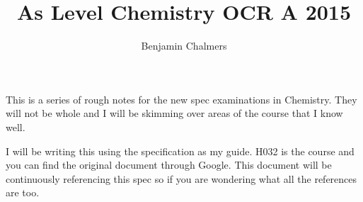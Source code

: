 \documentclass[11pt,a4paper]{memoir}
\author{Benjamin Chalmers}
\title{As Level Chemistry OCR A 2015}
\begin{document}
\frontmatter
\maketitle
\newpage
	This is a series of rough notes for the new spec examinations in Chemistry. They will not be whole and I will be skimming over areas of the course that I know well.
	
	I will be writing this using the specification as my guide. H032 is the course and you can find the original document through Google. This document will be continuously referencing this spec so if you are wondering what all the references are too.
\newpage
\tableofcontents
\mainmatter


	

	



	
\end{document}
